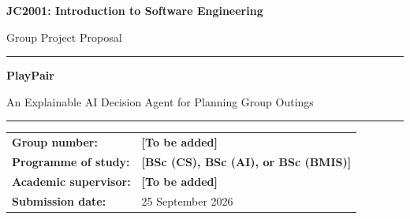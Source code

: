 \documentclass[12pt,a4paper]{article}
\newcommand{\placeholder}[1]{\textcolor{Placeholder}{\textbf{[#1]}}}
\renewcommand{\arraystretch}{1.2}
\begin{document}
\begin{titlepage}
  \thispagestyle{empty}
  \begingroup
  \singlespacing
  \renewcommand{\arraystretch}{1.05}
  \centering
  \vspace*{0.5cm}

  {\fontsize{16}{20}\selectfont\bfseries JC2001: Introduction to Software Engineering\par}
  \vspace{0.35cm}
  {\fontsize{15}{19}\selectfont Group Project Proposal\par}

  \vspace{0.75cm}
  {\color{Heading}\rule{\textwidth}{1.2pt}\par}
  \vspace{0.5cm}
  {\fontsize{24}{30}\selectfont\bfseries PlayPair\par}
  \vspace{0.25cm}
  {\fontsize{16}{21}\selectfont An Explainable AI Decision Agent for Planning Group Outings\par}
  \vspace{0.5cm}
  {\color{Heading}\rule{\textwidth}{1.2pt}\par}

  \vspace{0.55cm}
  \begin{tabular}{>{\bfseries}p{}p{}}
    Group number: & \placeholder{To be added} \\
    Programme of study: & \placeholder{BSc (CS), BSc (AI), or BSc (BMIS)} \\
    Academic supervisor: & \placeholder{To be added} \\
    Submission date: & 25 September 2026 \\
  \end{tabular}


\end{titlepage}
\end{document}
